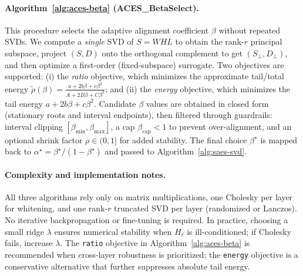 \paragraph{Algorithm~\ref{alg:aces-beta} (ACES\_BetaSelect).}
This procedure selects the adaptive alignment coefficient $\beta$ without repeated SVDs. We compute a \emph{single} SVD of $S = WHL$ to obtain the rank-$r$ principal subspace, project $(S,D)$ onto the orthogonal complement to get $(S_\perp, D_\perp)$, and then optimize a first-order (fixed-subspace) surrogate. Two objectives are supported: (i) the \emph{ratio} objective, which minimizes the approximate tail/total energy $\widetilde\rho(\beta)=\frac{a+2b\beta+c\beta^2}{A+2B\beta+C\beta^2}$; and (ii) the \emph{energy} objective, which minimizes the tail energy $a+2b\beta+c\beta^2$. Candidate $\beta$ values are obtained in closed form (stationary roots and interval endpoints), then filtered through guardrails: interval clipping $[\beta_{\min},\beta_{\max}]$, a cap $\beta_{\mathrm{cap}}<1$ to prevent over-alignment, and an optional shrink factor $\rho\in(0,1]$ for added stability. The final choice $\beta^\star$ is mapped back to $\alpha^\star=\beta^\star/(1-\beta^\star)$ and passed to Algorithm~\ref{alg:saes-svd}.

\paragraph{Complexity and implementation notes.}
All three algorithms rely only on matrix multiplications, one Cholesky per layer for whitening, and one rank-$r$ truncated SVD per layer (randomized or Lanczos). No iterative backpropagation or fine-tuning is required. In practice, choosing a small ridge $\lambda$ ensures numerical stability when $H_\ell$ is ill-conditioned; if Cholesky fails, increase $\lambda$. The \texttt{ratio} objective in Algorithm~\ref{alg:aces-beta} is recommended when cross-layer robustness is prioritized; the \texttt{energy} objective is a conservative alternative that further suppresses absolute tail energy.


    


